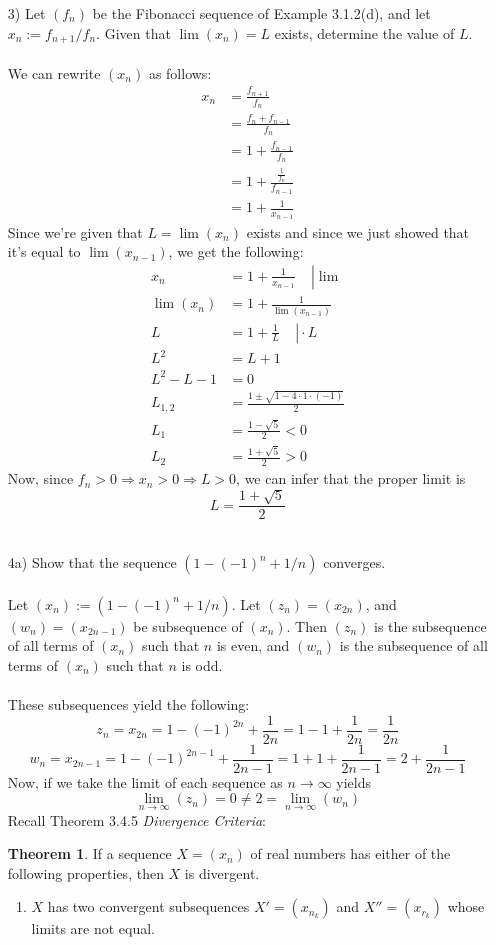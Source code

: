 \documentclass[12pt,letterpaper]{article}
\theoremstyle{case}
\theoremstyle{definition}
\newtheorem*{theorem*}{Theorem}
\begin{document}
\begin{enumerate}
\begin{enumerate}
		\item[3)] Let $(f_n)$ be the Fibonacci sequence of Example 3.1.2(d), and let $x_n := f_{n+1}/f_n$. Given that $\lim (x_n) =L$ exists, determine the value of $L$.
		\\\\We can rewrite $(x_n)$ as follows:
		\begin{align*}
			x_n &= \frac{f_{n+1}}{f_n} \\
			&=\frac{f_n+f_{n-1}}{f_n} \\
			&= 1+\frac{f_{n-1}}{f_n} \\
			&= 1+\frac{\frac{1}{f_n}}{f_{n-1}} \\
			&= 1+\frac{1}{x_{n-1}}
		\end{align*}
		Since we're given that $L=\lim (x_n)$ exists and since we just showed that it's equal to $\lim (x_{n-1})$, we get the following:
		\begin{align*}
			x_n &= \left. 1+\frac{1}{x_{n-1}}\ \ \ \ \ \right| \lim \\
			\lim (x_n) &= 1+\frac{1}{\lim(x_{n-1})} \\
			L &= \left. 1+\frac{1}{L}\ \ \ \ \ \right| \cdot L \\
			L^2 &= L + 1 \\
			L^2-L-1 &= 0 \\
			L_{1,2} &= \frac{1 \pm \sqrt{1-4 \cdot 1 \cdot (-1)}}{2} \\
			L_1 &= \frac{1-\sqrt{5}}{2} <0 \\
			L_2 &= \frac{1+\sqrt{5}}{2}>0
		\end{align*}
		Now, since $f_n >0 \Rightarrow x_n >0 \Rightarrow L>0$, we can infer that the proper limit is
		\[L=\frac{1+\sqrt{5}}{2}\]
		\\
		
		\item[4a)] Show that the sequence $(1-(-1)^n+1/n)$ converges.
		\\\\ Let $(x_n):=(1-(-1)^n+1/n)$. Let $(z_n)=(x_{2n})$, and $(w_n)=(x_{2n-1})$ be subsequence of $(x_n)$. Then $(z_n)$ is the subsequence of all terms of $(x_n)$ such that $n$ is even, and $(w_n)$ is the subsequence of all terms of $(x_n)$ such that $n$ is odd.
		\\\\These subsequences yield the following:
		\[z_n = x_{2n} = 1-(-1)^{2n}+\frac{1}{2n}=1-1+\frac{1}{2n}=\frac{1}{2n}\]
		\[w_n=x_{2n-1}=1-(-1)^{2n-1}+\frac{1}{2n-1}=1+1+\frac{1}{2n-1}=2+\frac{1}{2n-1}\]
		Now, if we take the limit of each sequence as $n \rightarrow \infty$ yields
		\[\lim_{n \to \infty} (z_n) = 0 \neq 2 = \lim_{n \to \infty} (w_n)\]
		Recall Theorem 3.4.5 \textit{Divergence Criteria}:
		\begin{theorem*}
			If a sequence $X=(x_n)$ of real numbers has either of the following properties, then $X$ is divergent.
			\begin{enumerate}
				\item $X$ has two convergent subsequences $X'=(x_{n_k})$ and $X''=(x_{r_k})$ whose limits are not equal.
				

\end{enumerate}
\end{theorem*}
\end{enumerate}
\end{enumerate}
\end{document}
